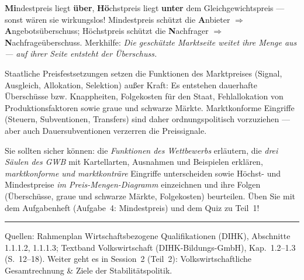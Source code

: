 \documentclass[11pt, a4paper]{article}
\begin{document}
\begin{eselsbruecke}
\textbf{Mi}ndestpreis liegt \textbf{über}, \textbf{Hö}chstpreis liegt \textbf{unter} dem
Gleichgewichtspreis --- sonst wären sie wirkungslos! Mindestpreis schützt die
\textbf{A}nbieter $\Rightarrow$ \textbf{A}ngebotsüberschuss; Höchstpreis schützt die
\textbf{N}achfrager $\Rightarrow$ \textbf{N}achfrageüberschuss. Merkhilfe: \emph{Die
geschützte Marktseite weitet ihre Menge aus --- auf ihrer Seite entsteht der Überschuss.}
\end{eselsbruecke}

\begin{merksatz}[title={\bfseries Beurteilung staatlicher Preiseingriffe (prüfungsrelevant!)}]
Staatliche Preisfestsetzungen setzen die Funktionen des Marktpreises (Signal, Ausgleich,
Allokation, Selektion) außer Kraft: Es entstehen dauerhafte Überschüsse bzw. Knappheiten,
Folgekosten für den Staat, Fehlallokation von Produktionsfaktoren sowie graue und schwarze
Märkte. Marktkonforme Eingriffe (Steuern, Subventionen, Transfers) sind daher
ordnungspolitisch vorzuziehen --- aber auch Dauersubventionen verzerren die Preissignale.
\end{merksatz}

\begin{merksatz}[title={\bfseries Wichtig für die Prüfungsvorbereitung (Teil 1)}]
Sie sollten sicher können: die \emph{Funktionen des Wettbewerbs} erläutern, die
\emph{drei Säulen des GWB} mit Kartellarten, Ausnahmen und Beispielen erklären,
\emph{marktkonforme und marktkonträre} Eingriffe unterscheiden sowie Höchst- und
Mindestpreise \emph{im Preis-Mengen-Diagramm} einzeichnen und ihre Folgen
(Überschüsse, graue und schwarze Märkte, Folgekosten) beurteilen. Üben Sie mit dem
Aufgabenheft (Aufgabe~4: Mindestpreis) und dem Quiz zu Teil~1!
\end{merksatz}

\vspace{1em}
\hrule
\vspace{0.8em}
\noindent\textsf{\small Quellen: Rahmenplan Wirtschaftsbezogene Qualifikationen (DIHK), Abschnitte 1.1.1.2, 1.1.1.3;
Textband Volkswirtschaft (DIHK-Bildungs-GmbH), Kap.~1.2--1.3 (S.~12--18).
Weiter geht es in Session~2 (Teil~2): Volkswirtschaftliche Gesamtrechnung \& Ziele der Stabilitätspolitik.}
\end{document}
